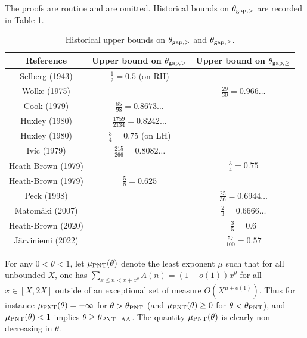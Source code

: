 The proofs are routine and are omitted.  Historical bounds on $\theta_{\mathrm{gap},>}$ are recorded in Table \ref{gaplarge-table}.

\begin{table}[ht]
    \caption{Historical upper bounds on $\theta_{\mathrm{gap},>}$ and $\theta_{\mathrm{gap},\geq}$.}
    \label{gaplarge-table}
    \centering
    \renewcommand{\arraystretch}{1.2}
    \begin{tabular}{|c|c|c|}
    \hline
    Reference & Upper bound on $\theta_{\mathrm{gap},>}$ & Upper bound on $\theta_{\mathrm{gap},\geq}$\\
    \hline
    Selberg (1943) \cite{selberg_1943} & $\frac{1}{2}=0.5$ (on RH) & \\
    \hline
    Wolke (1975) \cite{wolke_1975} & & $\frac{29}{30} = 0.966\dots$ \\
    \hline
    Cook (1979) \cite{cook_1979} & $\frac{85}{98} = 0.8673\dots$ & \\
    \hline
    Huxley (1980) \cite{huxley_large_1980} & $\frac{1759}{2134} = 0.8242\dots$ & \\
    \hline
    Huxley (1980) \cite{huxley_large_1980} & $\frac{3}{4} = 0.75$ (on LH) & \\
    \hline
    Iv\'ic (1979) \cite{ivic_sums_1979} & $\frac{215}{266} = 0.8082\dots$ & \\
    \hline
    Heath-Brown (1979) \cite{heath_brown_consecutive_III} & & $\frac{3}{4} = 0.75$ \\
    \hline
    Heath-Brown (1979) \cite{heath_brown_consecutive_II} & $\frac{5}{8} = 0.625$ & \\
    \hline
    Peck (1998) \cite{peck_differences_1998} & & $\frac{25}{36} = 0.6944\ldots$ \\
    \hline
    Matom\"{a}ki (2007) \cite{matomaki_large_2007} & & $\frac{2}{3} = 0.6666\ldots$ \\
    \hline
    Heath-Brown (2020) \cite{heath-brown_differences_2021} & & $\frac{3}{5} = 0.6$\\
    \hline
    J\"{a}rviniemi (2022) \cite{jarviniemi_large_2022} & & $\frac{57}{100} = 0.57$\\
    \hline
    \end{tabular}
\end{table}

For any $0 < \theta < 1$, let $\mu_{\mathrm{PNT}}(\theta)$ denote the least exponent $\mu$ such that for all unbounded $X$, one has $\sum_{x \leq n < x + x^\theta} \Lambda(n) = (1+o(1)) x^\theta$ for all $x \in [X,2X]$ outside of an exceptional set of measure $O(X^{\mu+o(1)})$.  Thus for instance $\mu_{\mathrm{PNT}}(\theta)=-\infty$ for $\theta > \theta_{\mathrm{PNT}}$ (and $\mu_{\mathrm{PNT}}(\theta) \geq 0$ for $\theta < \theta_{\mathrm{PNT}}$), and $\mu_{\mathrm{PNT}}(\theta) < 1$ implies $\theta \geq \theta_{\mathrm{PNT-AA}}$. The quantity $\mu_{\mathrm{PNT}}(\theta)$ is clearly non-decreasing in $\theta$.

